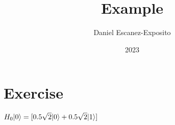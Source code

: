 \documentclass{article}
\title{Example}
\author{Daniel Escanez-Exposito}
\date{2023}
\begin{document}
    \maketitle

    \section{Exercise}
    $
    H_{0} |0\rangle \\ \\ 
=[0.5 \sqrt{2} |0\rangle +0.5 \sqrt{2} |1\rangle ]\\ 
    $
    
\end{document}
